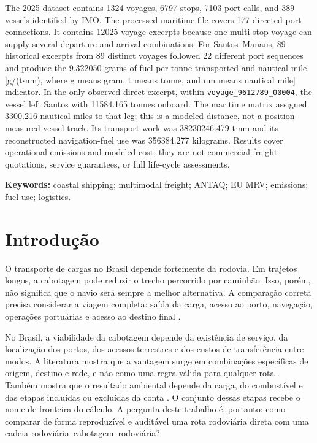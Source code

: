 \documentclass[12pt,a4paper]{report}
\begin{document}
The 2025 dataset contains \num{1324} voyages, \num{6797} stops, \num{7103} port calls, and \num{389} vessels identified by IMO. The processed maritime file covers \num{177} directed port connections. It contains \num{12025} voyage excerpts because one multi-stop voyage can supply several departure-and-arrival combinations. For Santos--Manaus, \num{89} historical excerpts from \num{89} distinct voyages followed \num{22} different port sequences and produce the \num{9.322050} grams of fuel per tonne transported and nautical mile [g/(t$\cdot$nm), where g means gram, t means tonne, and nm means nautical mile] indicator. In the only observed direct excerpt, within \texttt{voyage\_9612789\_00004}, the vessel left Santos with \num{11584.165} tonnes onboard. The maritime matrix assigned \num{3300.216} nautical miles to that leg; this is a modeled distance, not a position-measured vessel track. Its transport work was \num{38230246.479} t$\cdot$nm and its reconstructed navigation-fuel use was \num{356384.277} kilograms. Results cover operational emissions and modeled cost; they are not commercial freight quotations, service guarantees, or full life-cycle assessments.

\noindent\textbf{Keywords:} coastal shipping; multimodal freight; ANTAQ; EU MRV; emissions; fuel use; logistics.

\tableofcontents
\clearpage
{}

\chapter{Introdução}
\label{chap:introducao}

O transporte de cargas no Brasil depende fortemente da rodovia. Em trajetos longos, a cabotagem pode reduzir o trecho percorrido por caminhão. Isso, porém, não significa que o navio será sempre a melhor alternativa. A comparação correta precisa considerar a viagem completa: saída da carga, acesso ao porto, navegação, operações portuárias e acesso ao destino final \citep{icct2022,shortsea2019,competitiveness2024}.

No Brasil, a viabilidade da cabotagem depende da existência de serviço, da localização dos portos, dos acessos terrestres e dos custos de transferência entre modos. A literatura mostra que a vantagem surge em combinações específicas de origem, destino e rede, e não como uma regra válida para qualquer rota \citep{competitiveness2024}. Também mostra que o resultado ambiental depende da carga, do combustível e das etapas incluídas ou excluídas da conta \citep{decarb2024}. O conjunto dessas etapas recebe o nome de fronteira do cálculo. A pergunta deste trabalho é, portanto: como comparar de forma reproduzível e auditável uma rota rodoviária direta com uma cadeia rodoviária--cabotagem--rodoviária?
\end{document}
